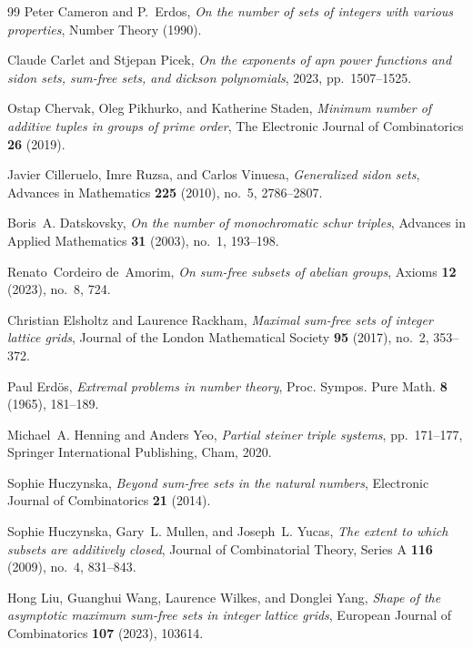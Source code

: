 \documentclass[12pt,a4paper]{article}
\begin{document}
	\begin{thebibliography}{99}
Peter Cameron and P.~Erdos, \emph{On the number of sets of integers with
  various properties}, Number Theory (1990).

Claude Carlet and Stjepan Picek, \emph{On the exponents of apn power functions
  and sidon sets, sum-free sets, and dickson polynomials}, 2023,
  pp.~1507--1525.

Ostap Chervak, Oleg Pikhurko, and Katherine Staden, \emph{Minimum number of
  additive tuples in groups of prime order}, The Electronic Journal of
  Combinatorics \textbf{26} (2019).

Javier Cilleruelo, Imre Ruzsa, and Carlos Vinuesa, \emph{Generalized sidon
  sets}, Advances in Mathematics \textbf{225} (2010), no.~5, 2786--2807.

Boris~A. Datskovsky, \emph{On the number of monochromatic schur triples},
  Advances in Applied Mathematics \textbf{31} (2003), no.~1, 193--198.

Renato~Cordeiro de~Amorim, \emph{On sum-free subsets of abelian groups}, Axioms
  \textbf{12} (2023), no.~8, 724.

Christian Elsholtz and Laurence Rackham, \emph{Maximal sum-free sets of integer
  lattice grids}, Journal of the London Mathematical Society \textbf{95}
  (2017), no.~2, 353--372.

Paul Erdös, \emph{Extremal problems in number theory}, Proc. Sympos. Pure
  Math. \textbf{8} (1965), 181–189.

Michael~A. Henning and Anders Yeo, \emph{Partial steiner triple systems},
  pp.~171--177, Springer International Publishing, Cham, 2020.

Sophie Huczynska, \emph{Beyond sum-free sets in the natural numbers},
  Electronic Journal of Combinatorics \textbf{21} (2014).

Sophie Huczynska, Gary~L. Mullen, and Joseph~L. Yucas, \emph{The extent to
  which subsets are additively closed}, Journal of Combinatorial Theory, Series
  A \textbf{116} (2009), no.~4, 831--843.

Hong Liu, Guanghui Wang, Laurence Wilkes, and Donglei Yang, \emph{Shape of the
  asymptotic maximum sum-free sets in integer lattice grids}, European Journal
  of Combinatorics \textbf{107} (2023), 103614.


\end{thebibliography}
\end{document}
